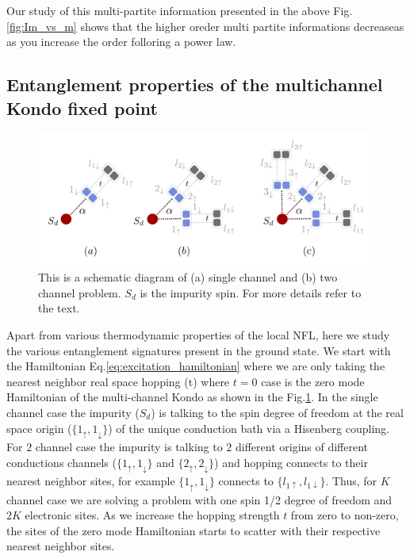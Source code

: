 \documentclass[reprint,prb,superscriptaddress]{revtex4-2}
\begin{document}
\noindent Our study of this multi-partite information presented in the above Fig.\eqref{fig:Im_vs_m} shows that the higher oreder multi partite informations decreaseas as you increase the order folloring a power law.





\subsection{Entanglement properties of the multichannel Kondo fixed point}
\begin{figure}[!htpb]
\includegraphics[scale=0.34]{plt/hopping_fock_states}
\caption{This is a schematic diagram of (a) single channel and (b) two channel problem. $S_d$ is the impurity spin. For more details refer to the text.}
\label{fig:schematic_hopping}
\end{figure}


\noindent Apart from various thermodynamic properties of the local NFL, here we study the various entanglement signatures present in the ground state. We start with the Hamiltonian Eq.\eqref{eq:excitation_hamiltonian} where we are only taking the nearest neighbor real space hopping (t) where $t=0$ case is the zero mode Hamiltonian of the multi-channel Kondo as shown in the Fig.\ref{fig:schematic_hopping}. In the single channel case the impurity ($S_d$) is talking to the spin degree of freedom at the real space origin ($\{1_{\uparrow},1_{\downarrow}\}$) of the unique conduction bath via a Hisenberg coupling. For $2$ channel case the impurity is talking to $2$ different origins of different conductions channels ($\{1_{\uparrow},1_{\downarrow}\}$ and $\{2_{\uparrow},2_{\downarrow}\}$) and hopping connects to their nearest neighbor sites, for example $\{1_{\uparrow},1_{\downarrow}\}$ connects to $\{l_{1\uparrow},l_{1\downarrow}\}$. Thus, for $K$ channel case we are solving a problem with one spin 1/2 degree of freedom and $2K$ electronic sites. As we increase the hopping strength $t$ from zero to non-zero, the sites of the zero mode Hamiltonian starts to scatter with their respective nearest neighbor sites.
\end{document}
